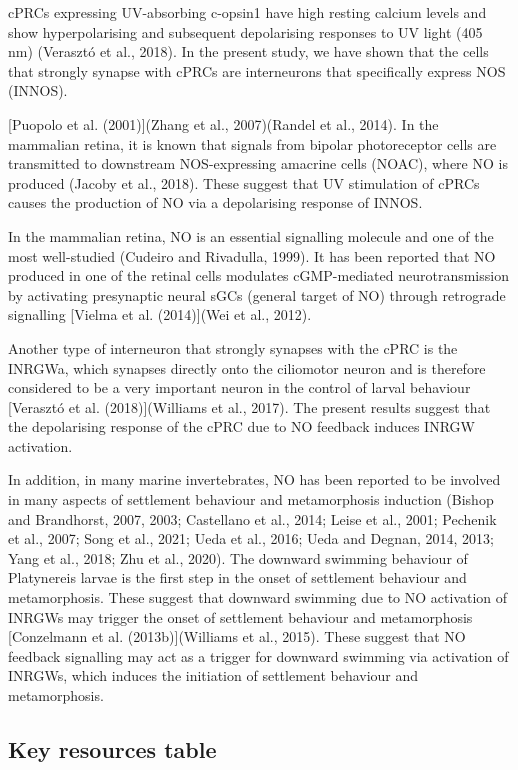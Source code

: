 \documentclass[
  10pt,
  onecolumn]{article}
\begin{document}
cPRCs expressing UV-absorbing c-opsin1 have high resting calcium levels
and show hyperpolarising and subsequent depolarising responses to UV
light (405 nm) (Verasztó et al., 2018). In the present study, we have
shown that the cells that strongly synapse with cPRCs are interneurons
that specifically express NOS (INNOS).

{[}Puopolo et al. (2001){]}(Zhang et al., 2007)(Randel et al., 2014). In
the mammalian retina, it is known that signals from bipolar
photoreceptor cells are transmitted to downstream NOS-expressing
amacrine cells (NOAC), where NO is produced (Jacoby et al., 2018). These
suggest that UV stimulation of cPRCs causes the production of NO via a
depolarising response of INNOS.

In the mammalian retina, NO is an essential signalling molecule and one
of the most well-studied (Cudeiro and Rivadulla, 1999). It has been
reported that NO produced in one of the retinal cells modulates
cGMP-mediated neurotransmission by activating presynaptic neural sGCs
(general target of NO) through retrograde signalling {[}Vielma et al.
(2014){]}(Wei et al., 2012).

Another type of interneuron that strongly synapses with the cPRC is the
INRGWa, which synapses directly onto the ciliomotor neuron and is
therefore considered to be a very important neuron in the control of
larval behaviour {[}Verasztó et al. (2018){]}(Williams et al., 2017).
The present results suggest that the depolarising response of the cPRC
due to NO feedback induces INRGW activation.

In addition, in many marine invertebrates, NO has been reported to be
involved in many aspects of settlement behaviour and metamorphosis
induction (Bishop and Brandhorst, 2007, 2003; Castellano et al., 2014;
Leise et al., 2001; Pechenik et al., 2007; Song et al., 2021; Ueda et
al., 2016; Ueda and Degnan, 2014, 2013; Yang et al., 2018; Zhu et al.,
2020). The downward swimming behaviour of Platynereis larvae is the
first step in the onset of settlement behaviour and metamorphosis. These
suggest that downward swimming due to NO activation of INRGWs may
trigger the onset of settlement behaviour and metamorphosis
{[}Conzelmann et al. (2013b){]}(Williams et al., 2015). These suggest
that NO feedback signalling may act as a trigger for downward swimming
via activation of INRGWs, which induces the initiation of settlement
behaviour and metamorphosis.

\hypertarget{key-resources-table}{%
\subsection{Key resources table}\label{key-resources-table}}
\end{document}
